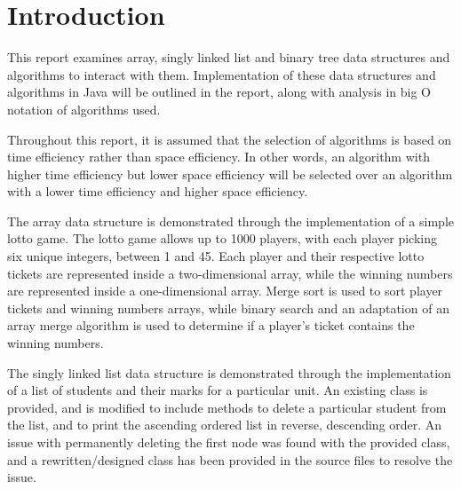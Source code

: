 \section{Introduction}

This report examines array, singly linked list and binary tree data structures and algorithms to interact with them. Implementation of these data structures and algorithms in Java will be outlined in the report, along with analysis in big O notation of algorithms used. 

Throughout this report, it is assumed that the selection of algorithms is based on time efficiency rather than space efficiency. In other words, an algorithm with higher time efficiency but lower space efficiency will be selected over an algorithm with a lower time efficiency and higher space efficiency.

The array data structure is demonstrated through the implementation of a simple lotto game. The lotto game allows up to 1000 players, with each player picking six unique integers, between 1 and 45. Each player and their respective lotto tickets are represented inside a two-dimensional array, while the winning numbers are represented inside a one-dimensional array. Merge sort is used to sort player tickets and winning numbers arrays, while binary search and an adaptation of an array merge algorithm is used to determine if a player's ticket contains the winning numbers.

The singly linked list data structure is demonstrated through the implementation of a list of students and their marks for a particular unit. An existing class is provided, and is modified to include methods to delete a particular student from the list, and to print the ascending ordered list in reverse, descending order. An issue with permanently deleting the first node was found with the provided class, and a rewritten/designed class has been provided in the source files to resolve the issue.